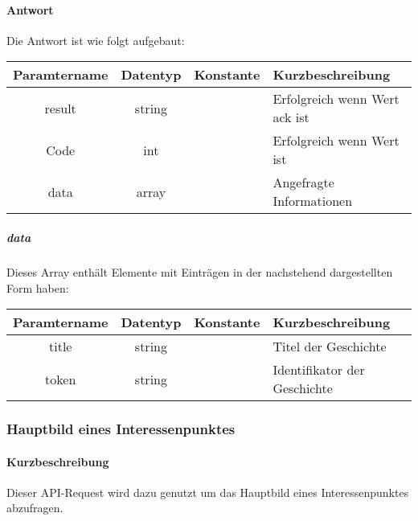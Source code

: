 \paragraph{Antwort}Die Antwort ist wie folgt aufgebaut:
\begin{table}[H]
	\begin{tabular}{|c|c|c|p{6.5cm}|}
		\hline
		\textbf{Paramtername} & \textbf{Datentyp} & \textbf{Konstante} & \textbf{Kurzbeschreibung}                                                                                               \\ \hline
		result              & string           &                 & Erfolgreich wenn Wert {\glqq ack\grqq} ist \\ \hline
		Code                & int              &                 & Erfolgreich wenn Wert {\glqq 0\grqq} ist \\ \hline
		data                & array            &                 & Angefragte Informationen \\ \hline
	\end{tabular}
\end{table}
\subparagraph{data}Dieses Array enthält Elemente mit Einträgen in der nachstehend dargestellten Form haben:
\begin{table}[H]
	\begin{tabular}{|c|c|c|p{6.5cm}|}
		\hline
		\textbf{Paramtername} & \textbf{Datentyp} & \textbf{Konstante} & \textbf{Kurzbeschreibung}    \\ \hline
		title                  & string          &                 & Titel der Geschichte \\ \hline
		token                  & string          &                 & Identifikator der Geschichte \\ \hline
	\end{tabular}
\end{table}

\subsubsection{Hauptbild eines Interessenpunktes }
\paragraph{Kurzbeschreibung}Dieser API-Request wird dazu genutzt um das Hauptbild eines Interessenpunktes abzufragen.
